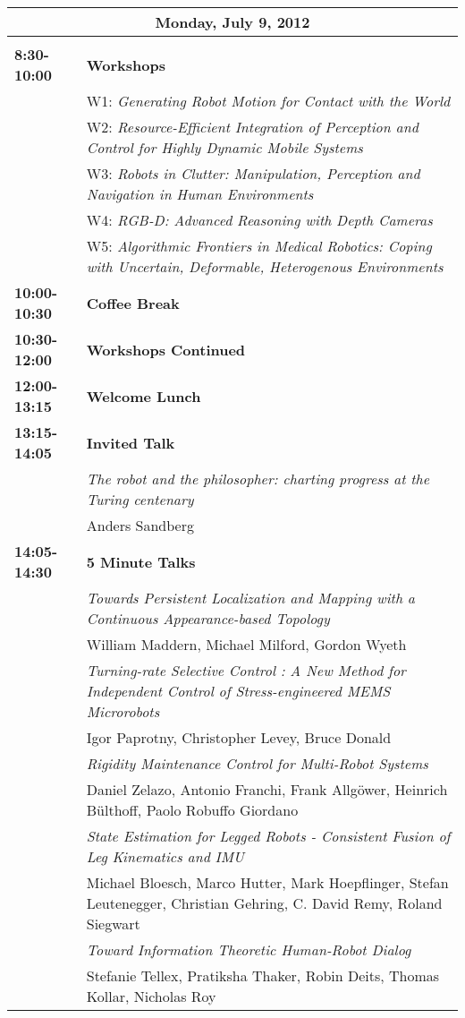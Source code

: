 \newpage
\begin{tabular}{lp{13.8cm}}
\hline
\multicolumn{2}{|c|}{{\bf Monday, July 9, 2012}}\\
\hline\\
{\bf 8:30-10:00} & {\bf Workshops} \\[2mm]
& W1: {\em Generating Robot Motion for Contact with the World}\\
& W2: {\em Resource-Efficient Integration of Perception and Control for Highly Dynamic Mobile Systems}\\
& W3: {\em Robots in Clutter: Manipulation, Perception and Navigation in Human Environments}\\
& W4: {\em RGB-D: Advanced Reasoning with Depth Cameras}\\
& W5: {\em Algorithmic Frontiers in Medical Robotics: Coping with Uncertain, Deformable, Heterogenous Environments}\\[2mm]

{\bf 10:00-10:30} & {\bf Coffee Break} \\[4mm]

{\bf 10:30-12:00} & {\bf Workshops Continued} \\[4mm]

{\bf 12:00-13:15} & {\bf Welcome Lunch} \\[4mm]

{\bf 13:15-14:05} & {\bf Invited Talk} \\[2mm]
& \em{The robot and the philosopher: charting progress at the Turing centenary}\\
& Anders Sandberg\\[2mm]

{\bf 14:05-14:30} & {\bf 5 Minute Talks} \\[2mm]
& \em{ Towards Persistent Localization and Mapping with a Continuous Appearance-based Topology}\\
& William Maddern\label{Maddern}, Michael Milford, Gordon Wyeth\\[2mm]
& \em{ Turning-rate Selective Control
: A New Method for Independent Control of Stress-engineered MEMS Microrobots}\\
& Igor Paprotny\label{Paprotny}, Christopher Levey, Bruce Donald\\[2mm]
& \em{ Rigidity Maintenance Control for Multi-Robot Systems}\\
& Daniel Zelazo\label{Zelazo}, Antonio Franchi, Frank Allgöwer, Heinrich Bülthoff, Paolo Robuffo Giordano\\[2mm]
& \em{ State Estimation for Legged Robots - Consistent Fusion of Leg Kinematics and IMU}\\
& Michael Bloesch\label{Bloesch}, Marco Hutter, Mark Hoepflinger, Stefan Leutenegger, Christian Gehring, C. David Remy, Roland Siegwart\\[2mm]
& \em{ Toward Information Theoretic Human-Robot Dialog}\\
& Stefanie Tellex\label{Tellex}, Pratiksha Thaker, Robin Deits, Thomas Kollar, Nicholas Roy\\[2mm]


\end{tabular}
